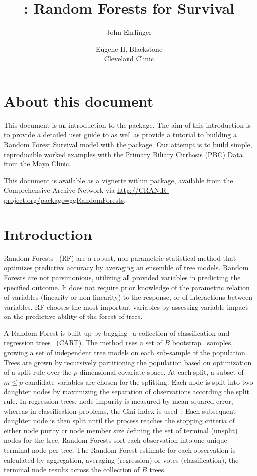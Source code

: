 \documentclass[nojss]{jss}\usepackage[]{graphicx}\usepackage[]{color}
\author{John Ehrlinger 
\and Eugene H. Blackstone\\Cleveland Clinic}
\title{\pkg{ggRandomForests}: Random Forests for Survival}
\begin{document}
\section{About this document}
This document is an introduction to the   package. The aim of this introduction is to provide a detailed user guide to  as well as provide a tutorial to building a Random Forest Survival model with the  package. Our attempt is to build simple, reproducible worked examples with the Primary Biliary Cirrhosis (PBC) Data from the Mayo Clinic.

This document is available as a vignette within  package, available from the Comprehensive  Archive Network via \url{http://CRAN.R-project.org/package=ggRandomForests}.

\section{Introduction} \label{S:introduction}

Random Forests~\citep{Breiman:2001} (RF) are a robust, non-parametric statistical method that optimizes predictive accuracy by averaging an ensemble of tree models. Random Forests are not parsimonious, utilizing all provided variables in predicting the specified outcome. It does not require prior knowledge of the parametric relation of variables (linearity or non-linearity) to the response, or of interactions between variables. RF chooses the most important variables by assessing variable impact on the predictive ability of the forest of trees.

A Random Forest is built up by bagging~\citep{Breiman:1996} a collection of classification and regression trees~\citep{cart:1984} (CART). The method uses a set of $B$ bootstrap~\citep{bootstrap:1994} samples, growing a set of independent tree models on each sub-sample of the population. Trees are grown by recursively partitioning the population based on optimization of a split rule over the $p$ dimensional covariate space. At each split, a subset of  $m \le p$ candidate variables are chosen for the splitting. Each node is split into two daughter nodes by maximizing the separation of observations according the split rule. In regression trees, node impurity is measured by mean squared error, whereas in classification problems, the Gini index is used~\citep{FriedmanGreedyfunction:2000}. Each subsequent daughter node is then split until the process reaches the stopping criteria of either node purity or node member size defining the set of terminal (unsplit) nodes for the tree. Random Forests sort each observation into one unique terminal node per tree. The Random Forest estimate for each observation is calculated by aggregation, averaging (regression) or votes (classification), the terminal node results across the collection of $B$ trees. 
\end{document}

